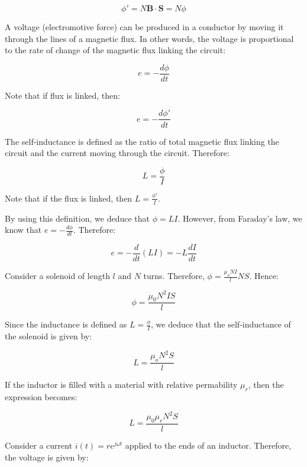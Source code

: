 \documentclass{article}
\begin{document}
\begin{proposition}
\begin{proposition}
    \[ \phi' = N\mathbf{B} \cdot \mathbf{S} = N\phi \]
\end{proposition}

\begin{theorem}
    A voltage (electromotive force) can be produced in a conductor by moving it through the lines of a magnetic flux. In other words, the voltage is proportional to the rate of change of the magnetic flux linking the circuit:

    \[ e = -\frac{d\phi}{dt} \]

    Note that if flux is linked, then:

    \[ e = -\frac{d\phi'}{dt} \]
\end{theorem}

\begin{definition}
    The self-inductance is defined as the ratio of total magnetic flux linking the circuit and the current moving through the circuit. Therefore:

    \[ L = \frac{\phi}{I} \]

    Note that if the flux is linked, then $L = \frac{\phi'}{I}$.
\end{definition}

By using this definition, we deduce that $\phi = LI$. However, from Faraday's law, we know that $e = -\frac{d\phi}{dt}$. Therefore:

\[ e = -\frac{d}{dt}(LI) = -L \frac{dI}{dt} \]

\begin{example}
    Consider a solenoid of length $l$ and $N$ turns. Therefore, $\phi = \frac{\mu_oNI}{l} NS$. Hence:

    \[ \phi = \frac{\mu_0N^2IS}{l} \]

    Since the inductance is defined as $L = \frac{\phi}{I}$, we deduce that the self-inductance of the solenoid is given by:

    \[ L = \frac{\mu_oN^2S}{l} \]

    If the inductor is filled with a material with relative permability $\mu_r$, then the expression becomes:

    \[ L = \frac{\mu_0\mu_rN^2S}{l} \]
\end{example}

\begin{proposition}

Consider a current $i(t) = re^{j\omega t}$ applied to the ends of an inductor. Therefore, the voltage is given by:


\end{proposition}
\end{proposition}
\end{document}

